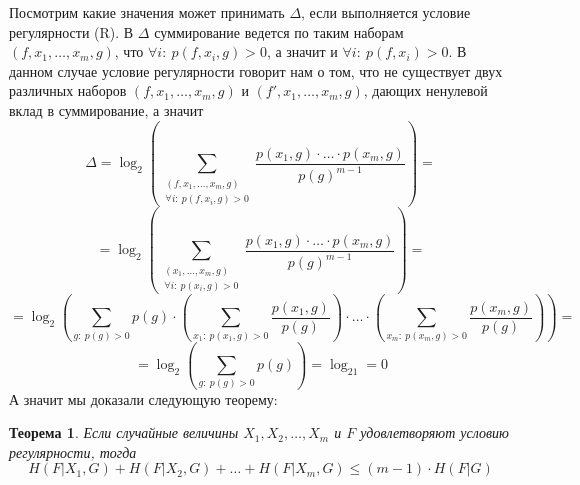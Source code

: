 \documentclass[a4paper]{article}
\newtheorem*{mtheorem}{Теорема}
\begin{document}
Посмотрим какие значения может принимать $\Delta$, если выполняется условие регулярности (R). В $\Delta$ 
суммирование ведется по таким наборам $(f, x_1, \ldots, x_m, g)$, что $\forall i:\ p(f,x_i,g)>0$, а 
значит и $\forall i:\ p(f,x_i)>0$. В данном случае условие регулярности говорит нам о том, что
не существует двух различных наборов $(f, x_1, \ldots, x_m, g)$ и $(f', x_1, \ldots, x_m, g)$, дающих 
ненулевой вклад в суммирование, а значит $$\Delta = \log_2\left(\sum\limits_{\substack{(f,x_1,\ldots,x_m,g) 
\\ \forall i:\ p(f,x_i,g)>0}}\frac{p(x_1,g)\cdot\ldots\cdot p(x_m,g)}{p(g)^{m-1}}\right) = $$ 
$$ = \log_2\left(\sum\limits_{\substack{(x_1,\ldots,x_m,g) \\ \forall i:\ p(x_i,g)>0}}\frac{p(x_1,g)\cdot\ldots\cdot p(x_m,g)}{p(g)^{m-1}}\right) = $$
$$ = \log_2\left(\sum\limits_{g:\ p(g) > 0}p(g)\cdot\left(\sum\limits_{x_1:\ p(x_1, g) > 0}\frac{p(x_1,g)}{p(g)}\right)\cdot\ldots
\cdot\left(\sum\limits_{x_m:\ p(x_m, g) > 0}\frac{p(x_m,g)}{p(g)}\right)\right) = $$ 
$$ = \log_2\left(\sum\limits_{g:\ p(g) > 0}p(g)\right) = \log_21 = 0$$ А значит мы доказали следующую теорему:
\begin{mtheorem}
    Если случайные величины $X_1, X_2, \ldots, X_m$ и $F$ удовлетворяют условию регулярности, тогда 
    $$H(F|X_1, G) + H(F|X_2, G) + \ldots + H(F|X_m, G) \leq (m-1)\cdot H(F|G)$$
\end{mtheorem}









\end{document}
